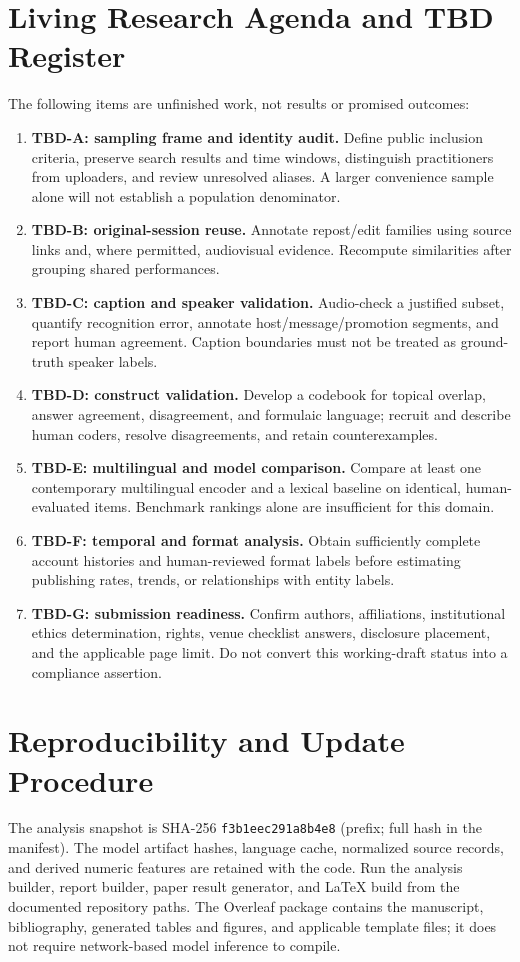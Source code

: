 



\appendix
\section{Living Research Agenda and TBD Register}
The following items are unfinished work, not results or promised outcomes:
\begin{enumerate}
\item \textbf{TBD-A: sampling frame and identity audit.} Define public inclusion criteria, preserve search results and time windows, distinguish practitioners from uploaders, and review unresolved aliases. A larger convenience sample alone will not establish a population denominator.
\item \textbf{TBD-B: original-session reuse.} Annotate repost/edit families using source links and, where permitted, audiovisual evidence. Recompute similarities after grouping shared performances.
\item \textbf{TBD-C: caption and speaker validation.} Audio-check a justified subset, quantify recognition error, annotate host/message/promotion segments, and report human agreement. Caption boundaries must not be treated as ground-truth speaker labels.
\item \textbf{TBD-D: construct validation.} Develop a codebook for topical overlap, answer agreement, disagreement, and formulaic language; recruit and describe human coders, resolve disagreements, and retain counterexamples.
\item \textbf{TBD-E: multilingual and model comparison.} Compare at least one contemporary multilingual encoder and a lexical baseline on identical, human-evaluated items. Benchmark rankings alone are insufficient for this domain.
\item \textbf{TBD-F: temporal and format analysis.} Obtain sufficiently complete account histories and human-reviewed format labels before estimating publishing rates, trends, or relationships with entity labels.
\item \textbf{TBD-G: submission readiness.} Confirm authors, affiliations, institutional ethics determination, rights, venue checklist answers, disclosure placement, and the applicable page limit. Do not convert this working-draft status into a compliance assertion.
\end{enumerate}

\section{Reproducibility and Update Procedure}
The analysis snapshot is SHA-256 \texttt{f3b1eec291a8b4e8} (prefix; full hash in the manifest). The model artifact hashes, language cache, normalized source records, and derived numeric features are retained with the code. Run the analysis builder, report builder, paper result generator, and LaTeX build from the documented repository paths. The Overleaf package contains the manuscript, bibliography, generated tables and figures, and applicable template files; it does not require network-based model inference to compile.

